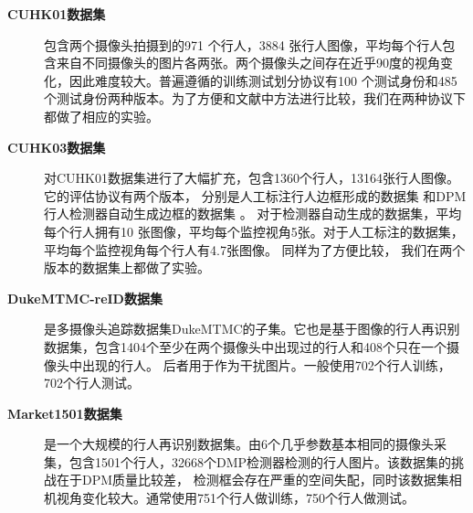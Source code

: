 \begin{description}
	\item[\textbf{CUHK01数据集}]
	      包含两个摄像头拍摄到的971 个行人，3884 张行人图像，平均每个行人包含来自不同摄像头的图片各两张。两个摄像头之间存在近乎90度的视角变化，因此难度较大。普遍遵循的训练测试划分协议有100 个测试身份和485个测试身份两种版本。为了方便和文献中方法进行比较，我们在两种协议下都做了相应的实验。
	\item[\textbf{CUHK03数据集}]
	      对CUHK01数据集进行了大幅扩充，包含1360个行人，13164张行人图像。它的评估协议有两个版本，
	      分别是人工标注行人边框形成的数据集
	      和DPM行人检测器自动生成边框的数据集
	      。
	      对于检测器自动生成的数据集，平均每个行人拥有10 张图像，平均每个监控视角5张。对于人工标注的数据集，平均每个监控视角每个行人有4.7张图像。
	      同样为了方便比较，
	      我们在两个版本的数据集上都做了实验。
	      
	      
	      
	      
	\item[\textbf{DukeMTMC-reID数据集}]是多摄像头追踪数据集DukeMTMC的子集。它也是基于图像的行人再识别数据集，包含1404个至少在两个摄像头中出现过的行人和408个只在一个摄像头中出现的行人。
	      后者用于作为干扰图片。一般使用702个行人训练，702个行人测试。
	      
	\item[\textbf{Market1501数据集}]是一个大规模的行人再识别数据集。由6个几乎参数基本相同的摄像头采集，包含1501个行人，32668个DMP检测器检测的行人图片。该数据集的挑战在于DPM质量比较差，
	      检测框会存在严重的空间失配，同时该数据集相机视角变化较大。通常使用751个行人做训练，750个行人做测试。
\end{description}

